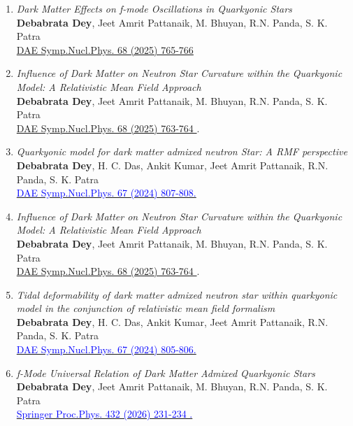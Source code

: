 \begin{enumerate}
	
\item \textit{Dark Matter Effects on f-mode Oscillations in Quarkyonic Stars}\\ 
\textbf{Debabrata Dey}, Jeet Amrit Pattanaik, M. Bhuyan, R.N. Panda, S. K. Patra
\\\href{ www.sympnp.org/proceedings}{DAE Symp.Nucl.Phys. 68 (2025) 765-766}
	
\item \textit{Influence of Dark Matter on Neutron Star Curvature within the Quarkyonic Model: A Relativistic Mean Field Approach}\\
\textbf{Debabrata Dey}, Jeet Amrit Pattanaik, M. Bhuyan, R.N. Panda, S. K. Patra\\\href{ www.sympnp.org/proceedings}{ DAE Symp.Nucl.Phys. 68 (2025) 763-764 }.
 
\item \textit\textit{Quarkyonic model for dark matter admixed neutron Star: A RMF perspective}\\
\textbf{Debabrata Dey}, H. C. Das, Ankit Kumar, Jeet Amrit Pattanaik, R.N. Panda, S. K. Patra\\
\href{www.sympnp.org/proceedings}{\textcolor{blue}{DAE Symp.Nucl.Phys. 67 (2024) 807-808.}}

\item \textit{Influence of Dark Matter on Neutron Star Curvature within the Quarkyonic Model: A Relativistic Mean Field Approach}\\
\textbf{Debabrata Dey}, Jeet Amrit Pattanaik, M. Bhuyan, R.N. Panda, S. K. Patra\\\href{ www.sympnp.org/proceedings}{ DAE Symp.Nucl.Phys. 68 (2025) 763-764 }.

\item \textit\textit{Tidal deformability of dark matter admixed neutron star within quarkyonic model in the conjunction of relativistic mean field formalism}\\
\textbf{Debabrata Dey}, H. C. Das, Ankit Kumar, Jeet Amrit Pattanaik, R.N. Panda, S. K. Patra\\
\href{www.sympnp.org/proceedings}{\textcolor{blue}{DAE Symp.Nucl.Phys. 67 (2024) 805-806.}}

\item \textit\textit{f-Mode Universal Relation of Dark Matter Admixed Quarkyonic Stars}\\
\textbf{Debabrata Dey}, Jeet Amrit Pattanaik, M. Bhuyan, R.N. Panda, S. K. Patra\\
\href{https://link.springer.com/chapter/10.1007/978-981-95-1513-4_51}{\textcolor{blue}{Springer Proc.Phys. 432 (2026) 231-234 .}}


\end{enumerate}
